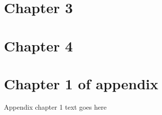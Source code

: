 \documentclass[phd,tocprelim]{cornell}
\begin{document}








\chapter{Chapter 3}

\chapter{Chapter 4}

\appendix
\chapter{Chapter 1 of appendix}
Appendix chapter 1 text goes here


\end{document}
